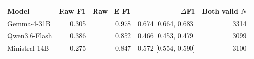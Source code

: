 \begin{tabular}{lrrrr}
\toprule
Model & Raw F1 & Raw+E F1 & $\Delta$F1 & Both valid $N$ \\
\midrule
Gemma-4-31B & 0.305 & 0.978 & 0.674 [0.664, 0.683] & 3314 \\
Qwen3.6-Flash & 0.386 & 0.852 & 0.466 [0.453, 0.479] & 3099 \\
Ministral-14B & 0.275 & 0.847 & 0.572 [0.554, 0.590] & 3100 \\
\bottomrule
\end{tabular}
